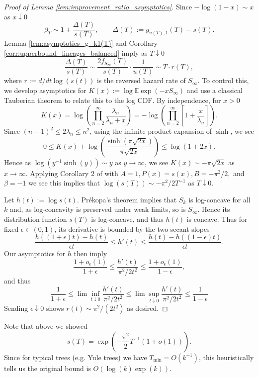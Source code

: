 \documentclass[10pt,oneside,reqno]{article}
\theoremstyle{plain}
\theoremstyle{definition}
\numberwithin{equation}{section}
\renewcommand{\cite}{\citep}
\renewcommand{\leq}{\leqslant}
\newcommand{\E}{\mathbb{E}}
\begin{document}
 \begin{proof}[Proof of Lemma \ref{lem:improvement_ratio_asymptotics}]
     
  Since $-\log(1-x) \sim x$ as $x \downarrow 0$
%
\[\beta_T \sim 1 + \frac{\Delta(T)}{s(T)}, \qquad \Delta(T) := g_{u(T), 1}(T) - s(T). \]
%
\noindent Lemma \ref{lem:asymptotics_g_k1(T)} and Corollary \ref{corr:upperbound_lineages_balanced} imply as $T \downarrow 0$
%
\[\frac{\Delta(T)}{s(T)} \sim \frac{2f_{S_\infty}(T)}{s(T)} \cdot \frac{1}{u(T)} \sim T \cdot r(T),\]
%
\noindent where $r := d/dt \log(s(t))$ is the reversed hazard rate of $S_\infty$. To control this, we develop asymptotics for  $K(x):=\log \E \exp(-xS_\infty)$ and use a classical Tauberian theorem to relate this to the log CDF. By independence, for $x > 0$
%
\[K(x) = \log \left(\prod_{n=2}^\infty \frac{\lambda_n}{\lambda_n + x}\right) = -\log\left(\prod_{n=2}^\infty \left[1 + \frac{x}{\lambda_n}\right]\right).\]
%
\noindent Since $(n-1)^2 \leq 2\lambda_n \leq n^2$, using the infinite product expansion of $\sinh$, we see
%
\[0 \leq K(x) + \log\left(\frac{\sinh(\pi \sqrt{2x})}{\pi \sqrt{2x}}\right) \leq \log(1+2x).\]
%
\noindent Hence as $\log(y^{-1} \sinh(y)) \sim y$ as $y \to \infty$, we see $K(x) \sim -\pi\sqrt{2x}$ as $x \to \infty$. Applying Corollary 2 of \cite{cadena2015notetauberiantheoremsexponential} with $A = 1, P(x) = s(x), B = -\pi^2/2,$ and $\beta = -1$ we see this implies that $\log(s(T)) \sim -\pi^2/2 T^{-1}$ as $T \downarrow 0$. 

 Let $h(t) := \log s(t)$. Pr\'ekopa's theorem implies that $S_k$ is log-concave for all $k$ and, as log-concavity is preserved under weak limits, so is $S_\infty$. Hence its distribution function $s(T)$ is log-concave, and thus $h(t)$ is concave. Thus for fixed $\epsilon \in (0,1)$, its derivative is bounded by the two secant slopes
%
\[\frac{h((1+\epsilon)t) - h(t)}{\epsilon t} \leq h'(t) \leq \frac{h(t) - h((1-\epsilon)t)}{\epsilon t}.\]
%
\noindent Our asymptotics for $h$ then imply
%
\[\frac{1 + o_\epsilon(1)}{1+\epsilon} \leq \frac{h'(t)}{\pi^2/2t^2} \leq \frac{1+o_\epsilon(1)}{1-\epsilon},\]
% 
\noindent and thus
%
\[\frac{1}{1+\epsilon} \leq\lim\inf_{t \downarrow 0} \frac{h'(t)}{\pi^2/2t^2} \leq \lim\sup_{t \downarrow 0} \frac{h'(t)}{\pi^2/2t^2} \leq \frac{1}{1-\epsilon} \]
%
\noindent Sending $\epsilon \downarrow 0$ shows $r(t) \sim \pi^2/(2t^2)$ as desired.
\end{proof}

\noindent Note that above we showed
%
\[s(T) = \exp\left(-\frac{\pi^2}{2} T^{-1} (1 + o(1)) \right).\]
%
Since for typical trees (e.g. Yule trees) we have $T_{\mathrm{min}} = O(k^{-1})$, this heuristically tells us the original bound is $O(\log(k) \exp(k))$.
\end{document}
